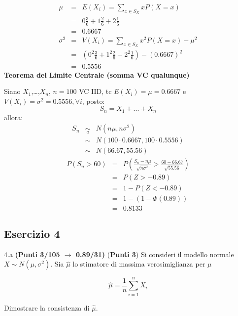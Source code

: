 \documentclass[
  11pt,
]{book}
\theoremstyle{mytheoremstyle}
\theoremstyle{mydefstyle}
\newenvironment{sol}
  {
  \begin{tcolorbox}[enhanced,breakable,arc=0.1mm,boxrule=1pt,colback=white,colframe=iblue,
  title=\bf \fontfamily{lmss}\selectfont \hspace{.5 cm} Soluzione,drop fuzzy shadow]

}{
\end{tcolorbox}
  }
\begin{document}
\begin{sol}
\begin{eqnarray*} \mu &=& E(X_i) = \sum_{x\in S_X}x P(X=x)\\ 
 &=&  0  \frac { 3 }{ 6 }+ 1  \frac { 2 }{ 6 }+ 2  \frac { 1 }{ 6 } \\ 
            &=& 0.6667 \\ 
 \sigma^2 &=& V(X_i) = \sum_{x\in S_X}x^2 P(X=x)-\mu^2\\ 
 &=&\left(  0  ^2\frac { 3 }{ 6 }+ 1  ^2\frac { 2 }{ 6 }+ 2  ^2\frac { 1 }{ 6 } \right)-( 0.6667 )^2\\ 
            &=& 0.5556 
\end{eqnarray*}
\textbf{Teorema del Limite Centrale (somma VC qualunque)}

Siano \(X_1\),\ldots,\(X_n\), \(n=100\) VC IID, tc \(E(X_i)=\mu=0.6667\) e \(V(X_i)=\sigma^2=0.5556,\forall i\), posto:
\[
      S_n = X_1 + ... + X_n
      \]
allora:\begin{eqnarray*}
  S_n & \mathop{\sim}\limits_{a}& N(n\mu,n\sigma^2) \\
     &\sim & N(100\cdot0.6667,100\cdot0.5556) \\
     &\sim & N(66.67,55.56) 
  \end{eqnarray*}\begin{eqnarray*}
      P( S_n   >   60 ) 
        &=& P\left(  \frac { S_n  -  n\mu }{ \sqrt{n\sigma^2} }  >  \frac { 60  -  66.67 }{\sqrt{ 55.56 }} \right)  \\
                 &=& P\left(  Z   >   -0.89 \right) \\    &=& 1-P(Z< -0.89 )\\ 
                 &=&  1-(1-\Phi( 0.89 )) \\ &=&  0.8133 
      \end{eqnarray*}

\end{sol}

\subsection{Esercizio 4}\label{esercizio-4-33}

4.a \textbf{(Punti 3/105 \(\rightarrow\) 0.89/31)} (\textbf{Punti 3}) Si consideri il modello normale \(X\sim N(\mu,\sigma^2)\). Sia \(\hat\mu\) lo stimatore di massima verosimiglianza per \(\mu\)

\[
  \hat\mu = \frac 1n \sum_{i=1}^n X_i
\]

Dimostrare la consistenza di \(\hat\mu\).
\end{document}
